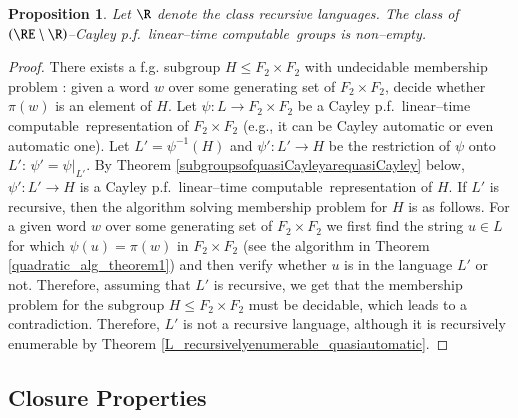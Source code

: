 \documentclass[article,12pt]{elsarticle}
\newtheorem{proposition}{Proposition}
\newcommand\linearC{Cayley p.f.~linear--time computable}
\begin{document}
\begin{proposition}
	\label{Mikhailova_example}	
	Let $\R$ denote the class recursive languages. The class of $\left(\RE \setminus\R\right)$--\linearC\ groups is non--empty.
\end{proposition}	
\begin{proof}  
	There exists a f.g. subgroup 
	$H \leqslant F_2 \times F_2$ 
	with undecidable membership 
	problem \cite{Mik66}: 
	given a word $w$ over some generating set 
	of $F_2  \times F_2$, decide whether 
	$\pi(w)$ is an element of $H$. 
	Let $\psi : 
	L \rightarrow F_2 \times F_2$ 
	be a \linearC\ representation 
	of $F_2 \times F_2$ (e.g., it can be Cayley 
	automatic or even automatic one). 
	Let $L' = \psi^{-1}(H)$ and  
	$\psi': L' \rightarrow H$ be the restriction of $\psi$ onto $L'$: $\psi' = \psi|_{L'}$. 
	By Theorem \ref{subgroupsofquasiCayleyarequasiCayley} below, 
	$\psi' : L' \rightarrow H$ is a \linearC\ 
	representation of $H$. If $L'$ is recursive, then 
	the algorithm solving membership problem for $H$ is as follows. 
	For a given word $w$ over some generating set of 
	$F_2 \times F_2$ we first find the string 
	$u \in L$ for which 
	$\psi (u) = \pi(w)$  in $F_2 \times F_2$ (see   
	the algorithm in Theorem \ref{quadratic_alg_theorem1}) 
	and then verify whether $u$ is in the language $L'$ or not. Therefore, assuming that $L'$ is recursive, we get 
	that the membership problem for the subgroup 
	$H \leqslant F_2 \times F_2$ must be decidable, which 
	leads to a contradiction. 
	Therefore, $L'$ is not a recursive language, although it is recursively enumerable by Theorem \ref{L_recursivelyenumerable_quasiautomatic}.         	
\end{proof}	 


\subsection{Closure Properties}
\end{document}
